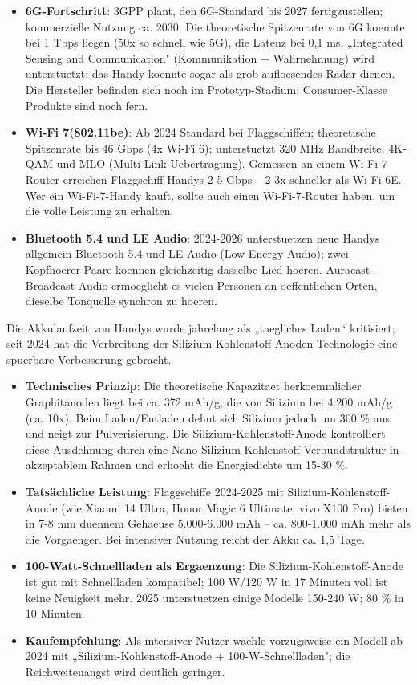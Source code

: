 \begin{itemize}
  \item \textbf{6G-Fortschritt}: 3GPP plant, den 6G-Standard bis 2027 fertigzustellen; kommerzielle Nutzung ca. 2030. Die theoretische Spitzenrate von 6G koennte bei 1 Tbps liegen (50x so schnell wie 5G), die Latenz bei 0,1 ms. „Integrated Sensing and Communication" (Kommunikation + Wahrnehmung) wird unterstuetzt; das Handy koennte sogar als grob aufloesendes Radar dienen. Die Hersteller befinden sich noch im Prototyp-Stadium; Consumer-Klasse Produkte sind noch fern.
  \item \textbf{Wi-Fi 7(802.11be)}: Ab 2024 Standard bei Flaggschiffen; theoretische Spitzenrate bis 46 Gbps (4x Wi-Fi 6); unterstuetzt 320 MHz Bandbreite, 4K-QAM und MLO (Multi-Link-Uebertragung). Gemessen an einem Wi-Fi-7-Router erreichen Flaggschiff-Handys 2-5 Gbps – 2-3x schneller als Wi-Fi 6E. Wer ein Wi-Fi-7-Handy kauft, sollte auch einen Wi-Fi-7-Router haben, um die volle Leistung zu erhalten.
  \item \textbf{Bluetooth 5.4 und LE Audio}: 2024-2026 unterstuetzen neue Handys allgemein Bluetooth 5.4 und LE Audio (Low Energy Audio); zwei Kopfhoerer-Paare koennen gleichzeitig dasselbe Lied hoeren. Auracast-Broadcast-Audio ermoeglicht es vielen Personen an oeffentlichen Orten, dieselbe Tonquelle synchron zu hoeren.
\end{itemize}


Die Akkulaufzeit von Handys wurde jahrelang als „taegliches Laden“ kritisiert; seit 2024 hat die Verbreitung der Silizium-Kohlenstoff-Anoden-Technologie eine spuerbare Verbesserung gebracht.

\begin{itemize}
  \item \textbf{Technisches Prinzip}: Die theoretische Kapazitaet herkoemmlicher Graphitanoden liegt bei ca. 372 mAh/g; die von Silizium bei 4.200 mAh/g (ca. 10x). Beim Laden/Entladen dehnt sich Silizium jedoch um 300 \% aus und neigt zur Pulverisierung. Die Silizium-Kohlenstoff-Anode kontrolliert diese Ausdehnung durch eine Nano-Silizium-Kohlenstoff-Verbundstruktur in akzeptablem Rahmen und erhoeht die Energiedichte um 15-30 \%.
  \item \textbf{Tatsächliche Leistung}: Flaggschiffe 2024-2025 mit Silizium-Kohlenstoff-Anode (wie Xiaomi 14 Ultra, Honor Magic 6 Ultimate, vivo X100 Pro) bieten in 7-8 mm duennem Gehaeuse 5.000-6.000 mAh – ca. 800-1.000 mAh mehr als die Vorgaenger. Bei intensiver Nutzung reicht der Akku ca. 1,5 Tage.
  \item \textbf{100-Watt-Schnellladen als Ergaenzung}: Die Silizium-Kohlenstoff-Anode ist gut mit Schnellladen kompatibel; 100 W/120 W in 17 Minuten voll ist keine Neuigkeit mehr. 2025 unterstuetzen einige Modelle 150-240 W; 80 \% in 10 Minuten.
  \item \textbf{Kaufempfehlung}: Als intensiver Nutzer waehle vorzugsweise ein Modell ab 2024 mit „Silizium-Kohlenstoff-Anode + 100-W-Schnellladen"; die Reichweitenangst wird deutlich geringer.
\end{itemize}

